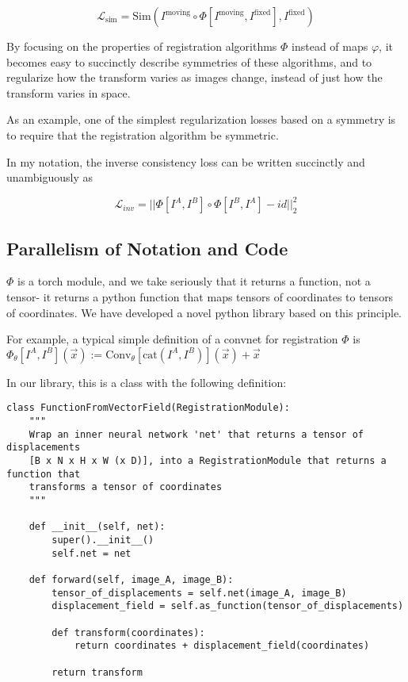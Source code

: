 \documentclass{article}
\begin{document}
$$ \mathcal{L}_\text{sim} = \text{Sim}(I^\text{moving} \circ  \Phi[I^\text{moving}, I^\text{fixed}] , I^\text{fixed}) $$

By focusing on the properties of registration algorithms $\Phi$ instead of maps
$\varphi$, it becomes easy to succinctly describe symmetries of these
algorithms, and to regularize how the transform varies as images change,
instead of just how the transform varies in space.

As an example, one of the simplest regularization losses based on a symmetry is
to require that the registration algorithm be symmetric.


In my notation, the inverse consistency loss can be written succinctly and
unambiguously as

$$ \mathcal{L}_{inv} = ||\Phi[I^A, I^B] \circ \Phi[I^B, I^A] - id||^2_2$$

\subsection{Parallelism of Notation and Code}

$\Phi$ is a torch module, and we take seriously that it returns a function, not a tensor- it returns a python function that maps tensors of coordinates to tensors of coordinates. We have developed a novel python library based on this principle. 

For example, a typical simple definition of a convnet for registration $\Phi$ is 
		$ \Phi_\theta[I^A, I^B](\vec{x}) := \text{Conv}_\theta[\text{cat}(I^A, I^B)](\vec{x}) + \vec{x} $

In our library, this is a class with the following definition:

\begin{verbatim}
class FunctionFromVectorField(RegistrationModule):
    """
    Wrap an inner neural network 'net' that returns a tensor of displacements
    [B x N x H x W (x D)], into a RegistrationModule that returns a function that
    transforms a tensor of coordinates
    """

    def __init__(self, net):
        super().__init__()
        self.net = net

    def forward(self, image_A, image_B):
        tensor_of_displacements = self.net(image_A, image_B)
        displacement_field = self.as_function(tensor_of_displacements)

        def transform(coordinates):
            return coordinates + displacement_field(coordinates)

        return transform
\end{verbatim}
\end{document}
